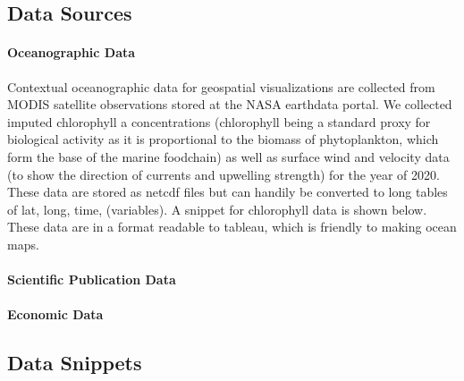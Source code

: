 \documentclass{article}
\begin{document}
\subsection{Data Sources}
\paragraph{Oceanographic Data}
Contextual oceanographic data for geospatial visualizations are collected from MODIS satellite observations stored at the NASA earthdata portal. We collected imputed chlorophyll a concentrations (chlorophyll being a standard proxy for biological activity as it is proportional to the biomass of phytoplankton, which form the base of the marine foodchain) as well as surface wind and velocity data (to show the direction of currents and upwelling strength) for the year of 2020. These data are stored as netcdf files but can handily be converted to long tables of lat, long, time, (variables). A snippet for chlorophyll data is shown below. These data are in a format readable to tableau, which is friendly to making ocean maps. 
\paragraph{Scientific Publication Data}

\paragraph{Economic Data}
\subsection{Data Snippets}
\end{document}

